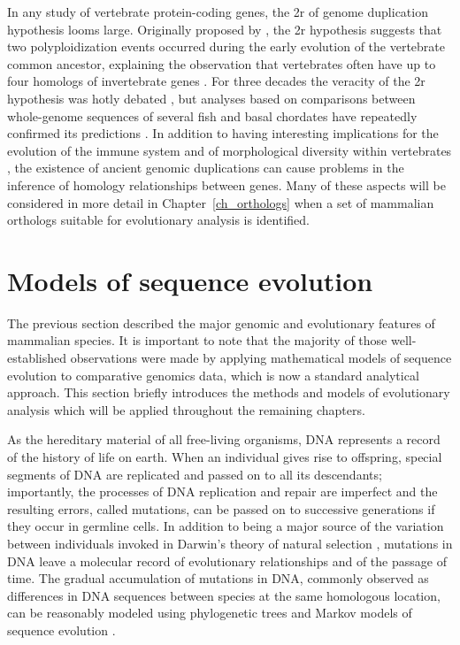 In any study of vertebrate protein-coding genes, the \ac{2r} of genome
duplication hypothesis looms large. Originally proposed by
\citet{Ohno1970}, the \ac{2r} hypothesis suggests that two
polyploidization events occurred during the early evolution of the
vertebrate common ancestor, explaining the observation that
vertebrates often have up to four homologs of invertebrate genes
\citep{Hokamp2003}. For three decades the veracity of the \ac{2r}
hypothesis was hotly debated \citep{McLysaght2002,Dehal2005}, but
analyses based on comparisons between whole-genome sequences of
several fish and basal chordates have repeatedly confirmed its
predictions \citep{Kasahara2007,Putnam2008b}. In addition to having
interesting implications for the evolution of the immune system and of
morphological diversity within vertebrates
\citep{Hughes1997,Hoffmann1999,Peer2009b}, the existence of ancient
genomic duplications can cause problems in the inference of homology
relationships between genes. Many of these aspects will be considered
in more detail in Chapter~\ref{ch_orthologs} when a set of mammalian
orthologs suitable for evolutionary analysis is identified.

\section{Models of sequence evolution}
\label{section_evolution_models}

The previous section described the major genomic and evolutionary
features of mammalian species. It is important to note that the
majority of those well-established observations were made by applying
mathematical models of sequence evolution to comparative genomics
data, which is now a standard analytical approach. This section
briefly introduces the methods and models of evolutionary analysis
which will be applied throughout the remaining chapters.

As the hereditary material of all free-living organisms, DNA
represents a record of the history of life on earth. When an
individual gives rise to offspring, special segments of DNA are
replicated and passed on to all its descendants; importantly, the
processes of DNA replication and repair are imperfect
\citep{Arnheim2009} and the resulting errors, called mutations, can be
passed on to successive generations if they occur in germline
cells. In addition to being a major source of the variation between
individuals invoked in Darwin's theory of natural selection
\citep{Darwin1859a}, mutations in DNA leave a molecular record of
evolutionary relationships and of the passage of time. The gradual
accumulation of mutations in DNA, commonly observed as differences in
DNA sequences between species at the same homologous location, can be
reasonably modeled using phylogenetic trees and Markov models of
sequence evolution \citep{Yang2006}.

